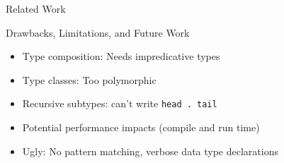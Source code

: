 \documentclass[final]{beamer}
\begin{document}
\begin{frame}[fragile]
\begin{columns}[t]
\begin{column}{.285\textwidth}
\begin{block}{Related Work}
\end{block}
\vspace{1cm}
\begin{block}{Drawbacks, Limitations, and Future Work}
\vspace{0.5cm}
\begin{itemize}
\item Type composition: Needs impredicative types
\item Type classes: Too polymorphic
\item Recursive subtypes: can't write \verb!head . tail!
\item Potential performance impacts (compile and run time)
\item Ugly: No pattern matching, verbose data type declarations 
\end{itemize}
\vspace{2cm}
\end{block}

\end{column}
\end{columns}
\end{frame}
\end{document}
